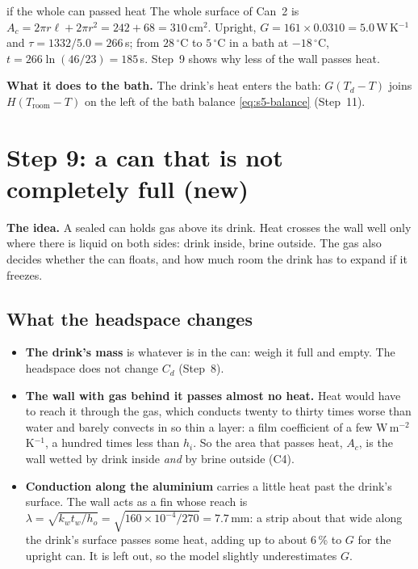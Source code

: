 \documentclass[11pt,a4paper]{article}
\newcommand{\dC}{\,{}^{\circ}\mathrm{C}}
\newcommand{\Troom}{T_{\mathrm{room}}}
\newcommand{\para}[1]{\par\smallskip\noindent\textbf{#1}\enspace}
\begin{document}
\begin{worked}{if the whole can passed heat}
The whole surface of Can~2 is $A_c = 2\pi r\ell + 2\pi r^2 = 242 + 68 = 310$\,cm$^2$. Upright, $G = 161\times0.0310
= 5.0$\,W\,K$^{-1}$ and $\tau = 1332/5.0 = 266$\,s; from $28\dC$ to $5\dC$ in a bath at $-18\dC$,
$t = 266\ln(46/23) = 185$\,s. Step~9 shows why less of the wall passes heat.
\end{worked}

\para{What it does to the bath.} The drink's heat enters the bath: $G(T_d - T)$ joins $H(\Troom - T)$ on
the left of the bath balance \eqref{eq:s5-balance} (Step~11).

\section{Step 9: a can that is not completely full (new)}\label{sec:s9}

\para{The idea.} A sealed can holds gas above its drink. Heat crosses the wall well only where there is
liquid on both sides: drink inside, brine outside. The gas also decides whether the can floats, and how much
room the drink has to expand if it freezes.

\subsection{What the headspace changes}
\begin{itemize}
\item \textbf{The drink's mass} is whatever is in the can: weigh it full and empty. The headspace does not
  change $C_d$ (Step~8).
\item \textbf{The wall with gas behind it passes almost no heat.} Heat would have to reach it through the
  gas, which conducts twenty to thirty times worse than water and barely convects in so thin a layer: a
  film coefficient of a few W\,m$^{-2}$K$^{-1}$, a hundred times less than $h_i$. So the area that passes
  heat, $A_c$, is the wall wetted by drink inside \emph{and} by brine outside (C4).
\item \textbf{Conduction along the aluminium} carries a little heat past the drink's surface. The wall acts
  as a fin whose reach is $\lambda = \sqrt{k_wt_w/h_o} = \sqrt{160\times10^{-4}/270} = 7.7$\,mm: a strip about
  that wide along the drink's surface passes some heat, adding up to about 6\,\% to $G$ for the upright
  can. It is left out, so the model slightly underestimates $G$.
\end{itemize}
\end{document}
